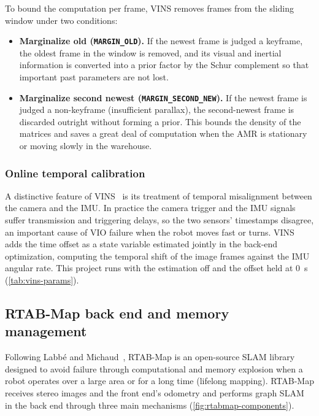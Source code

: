 To bound the computation per frame, VINS removes frames from the sliding
window under two conditions:

\begin{itemize}[leftmargin=2em]
  \item \textbf{Marginalize old (\texttt{MARGIN\_OLD}).} If the newest frame is
    judged a keyframe, the oldest frame in the window is removed, and its
    visual and inertial information is converted into a prior factor by the
    Schur complement so that important past parameters are not lost.
  \item \textbf{Marginalize second newest (\texttt{MARGIN\_SECOND\_NEW}).} If
    the newest frame is judged a non-keyframe (insufficient parallax), the
    second-newest frame is discarded outright without forming a prior. This
    bounds the density of the matrices and saves a great deal of computation
    when the AMR is stationary or moving slowly in the warehouse.
\end{itemize}

\subsubsection{Online temporal calibration}

A distinctive feature of VINS~\cite{qin2018td} is its treatment of temporal
misalignment between the camera and the IMU. In practice the camera trigger and
the IMU signals suffer transmission and triggering delays, so the two sensors'
timestamps disagree, an important cause of VIO failure when the robot moves fast
or turns. VINS adds the time offset as a state variable estimated jointly in the
back-end optimization, computing the temporal shift of the image frames against
the IMU angular rate. This project runs with the estimation off and the
offset held at \SI{0}{\second} (\cref{tab:vins-params}).

\subsection{RTAB-Map back end and memory management}
\label{sec:theory-rtab}

Following Labbé and Michaud~\cite{labbe2019}, RTAB-Map is an open-source SLAM
library designed to avoid failure through computational and memory explosion
when a robot operates over a large area or for a long time (lifelong mapping).
RTAB-Map receives stereo images and the front end's odometry and performs
graph SLAM in the back end through three main mechanisms
(\cref{fig:rtabmap-components}).

